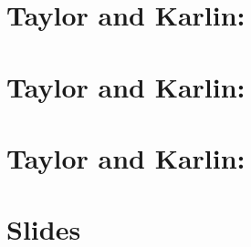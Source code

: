 \documentclass{article}
\begin{document}
\subsection{}
\subsection{}
\subsection{}

\setcounter{section}{3}
\section{Taylor and Karlin:}
\setcounter{subsection}{7}
\subsection{}

\section{Taylor and Karlin:}
\setcounter{subsection}{3}
\subsection{}

\setcounter{section}{5}
\section{Taylor and Karlin:}
\subsection{}
\subsection{}
\subsection{}
\subsection{}

\setcounter{section}{4}
\section{Slides}
\end{document}
